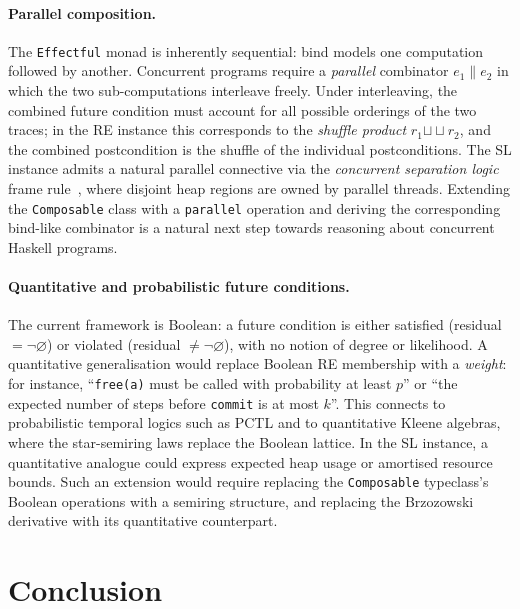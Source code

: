 \documentclass[acmsmall,screen]{acmart}
\newcommand{\shuffle}{\mathbin{\sqcup\!\!\!\sqcup}}
\newcommand{\univ}{\neg\varnothing}
\begin{document}
\paragraph{Parallel composition.}
The \lstinline{Effectful} monad is inherently sequential: bind models
one computation followed by another.
Concurrent programs require a \emph{parallel} combinator $e_1 \parallel e_2$
in which the two sub-computations interleave freely.
Under interleaving, the combined future condition must account for all
possible orderings of the two traces; in the RE instance this corresponds
to the \emph{shuffle product} $r_1 \shuffle r_2$, and the combined
postcondition is the shuffle of the individual postconditions.
The SL instance admits a natural parallel connective via the
\emph{concurrent separation logic} frame rule~\cite{o2007resources},
where disjoint heap regions are owned by parallel threads.
Extending the \lstinline{Composable} class with a \lstinline{parallel}
operation and deriving the corresponding bind-like combinator is a
natural next step towards reasoning about concurrent Haskell programs.

\paragraph{Quantitative and probabilistic future conditions.}
The current framework is Boolean: a future condition is either satisfied
(residual $= \univ$) or violated (residual $\neq \univ$), with no notion
of degree or likelihood.
A quantitative generalisation would replace Boolean RE membership with a
\emph{weight}: for instance, ``\lstinline{free(a)} must be called with
probability at least $p$'' or ``the expected number of steps before
\lstinline{commit} is at most $k$''.
This connects to probabilistic temporal logics such as PCTL and to
quantitative Kleene algebras, where the star-semiring laws replace
the Boolean lattice.
In the SL instance, a quantitative analogue could express expected
heap usage or amortised resource bounds.
Such an extension would require replacing the \lstinline{Composable}
typeclass's Boolean operations with a semiring structure, and
replacing the Brzozowski derivative with its quantitative counterpart.

\section{Conclusion}
\label{sec:conclusion}
\end{document}

